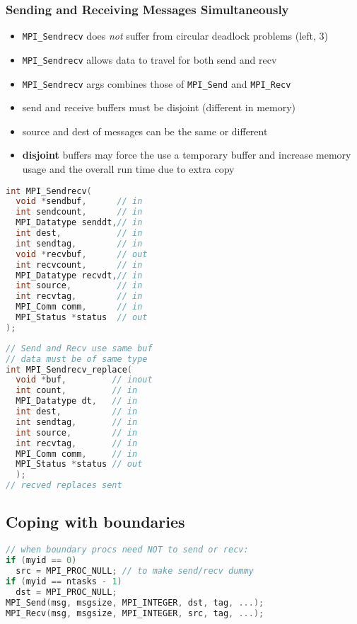 \subsubsection*{Sending and Receiving Messages Simultaneously}
\begin{itemize}
\item \texttt{MPI\_Sendrecv} does \emph{not} suffer from circular deadlock problems (left, 3)
\item \texttt{MPI\_Sendrecv} allows data to travel for both send and recv
\item \texttt{MPI\_Sendrecv} args combines those of \texttt{MPI\_Send} and \texttt{MPI\_Recv}
\item send and receive buffers must be disjoint (different in memory)
\item source and dest of messages can be the same or different
\item \textbf{disjoint} buffers may force the use a temporary buffer and increase memory usage and the overall run time due to extra copy
\end{itemize}
\begin{minipage}{0.5\linewidth}
\begin{lstlisting}[language=C,xleftmargin=0pt,xrightmargin=1pt]
int MPI_Sendrecv(
  void *sendbuf,      // in
  int sendcount,      // in
  MPI_Datatype senddt,// in
  int dest,           // in
  int sendtag,        // in
  void *recvbuf,      // out
  int recvcount,      // in
  MPI_Datatype recvdt,// in
  int source,         // in
  int recvtag,        // in
  MPI_Comm comm,      // in
  MPI_Status *status  // out
);
\end{lstlisting}
\end{minipage}
\begin{minipage}{0.5\linewidth}
\begin{lstlisting}[language=C,xleftmargin=2pt,xrightmargin=0pt]
// Send and Recv use same buf
// data must be of same type
int MPI_Sendrecv_replace(
  void *buf,         // inout
  int count,         // in
  MPI_Datatype dt,   // in
  int dest,          // in
  int sendtag,       // in
  int source,        // in
  int recvtag,       // in
  MPI_Comm comm,     // in
  MPI_Status *status // out
  );
// recved replaces sent
\end{lstlisting}
\end{minipage}
\subsection*{Coping with boundaries}
\begin{lstlisting}[language=C]
// when boundary procs need NOT to send or recv:
if (myid == 0)
  src = MPI_PROC_NULL; // to make send/recv dummy
if (myid == ntasks - 1)
  dst = MPI_PROC_NULL;
MPI_Send(msg, msgsize, MPI_INTEGER, dst, tag, ...);
MPI_Recv(msg, msgsize, MPI_INTEGER, src, tag, ...);
\end{lstlisting}

